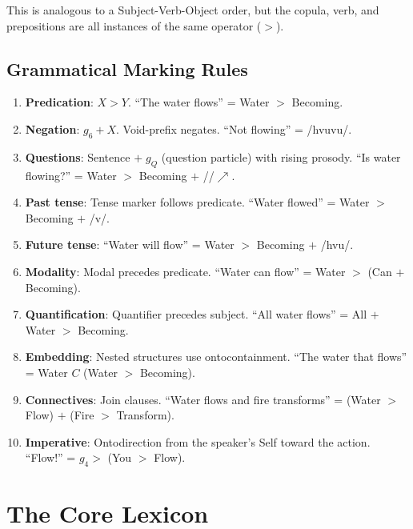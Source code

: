 \documentclass[12pt, letterpaper]{book}
\def\oplus{+}%
\def\triangleright{>}%
\def\subset{C}%
\def\mathfrak#1{#1}%
\begin{document}
\noindent This is analogous to a Subject-Verb-Object order, but the copula, verb, and prepositions are all instances of the same operator ($\triangleright$).

\subsection{Grammatical Marking Rules}

\begin{enumerate}[label=(\roman*)]
    \item \textbf{Predication}: $X \triangleright Y$. ``The water flows'' = Water $\triangleright$ Becoming.
    \item \textbf{Negation}: $\mathfrak{g}_6 \oplus X$. Void-prefix negates. ``Not flowing'' = /h\textturnscripta\textperiodcentered vuvu/.
    \item \textbf{Questions}: Sentence $+ \;\mathfrak{g}_{Q}$ (question particle) with rising prosody. ``Is water flowing?'' = Water $\triangleright$ Becoming $+$ /\textesh\textturnscripta/$\nearrow$.
    \item \textbf{Past tense}: Tense marker follows predicate. ``Water flowed'' = Water $\triangleright$ Becoming $+$ /v\textturnscripta/.
    \item \textbf{Future tense}: ``Water will flow'' = Water $\triangleright$ Becoming $+$ /h\textturnscripta vu/.
    \item \textbf{Modality}: Modal precedes predicate. ``Water can flow'' = Water $\triangleright$ (Can $\oplus$ Becoming).
    \item \textbf{Quantification}: Quantifier precedes subject. ``All water flows'' = All $\oplus$ Water $\triangleright$ Becoming.
    \item \textbf{Embedding}: Nested structures use ontocontainment. ``The water that flows'' = Water $\subset$ (Water $\triangleright$ Becoming).
    \item \textbf{Connectives}: Join clauses. ``Water flows and fire transforms'' = (Water $\triangleright$ Flow) $\oplus$ (Fire $\triangleright$ Transform).
    \item \textbf{Imperative}: Ontodirection from the speaker's Self toward the action. ``Flow!'' = $\mathfrak{g}_4 \triangleright$ (You $\triangleright$ Flow).
\end{enumerate}

\section{The Core Lexicon}
\end{document}
